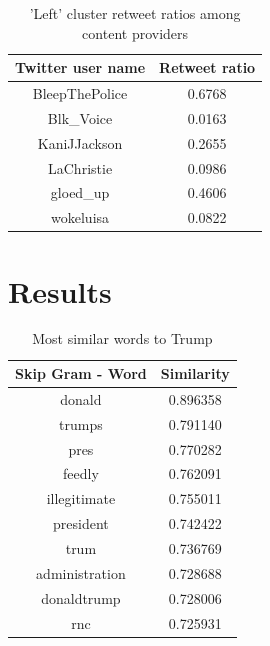 \documentclass[12pt, authoryear]{elsarticle}
\begin{document}
\begin{center}
\begin{table}[H]
\begin{tabular}{ c c } 
Twitter user name & Retweet ratio \\
 \hline
BleepThePolice &   0.6768 \\
Blk\_Voice       &  0.0163 \\
KaniJJackson   &   0.2655 \\
LaChristie  &      0.0986 \\
gloed\_up       &   0.4606 \\
wokeluisa     &    0.0822 \\
 \hline
\end{tabular}
\caption{'Left' cluster retweet ratios among content providers}
\label{table:2}
\end{table}
\end{center}

\section{Results}


\begin{center}
\begin{table}[H]
\begin{tabular}{ c c } 
Skip Gram - Word   &  Similarity \\
 \hline
donald   &  0.896358\\
trumps   &  0.791140\\
pres   &  0.770282\\
feedly   &  0.762091\\
illegitimate  &   0.755011\\
president   &  0.742422\\
trum   &  0.736769\\
administration  &   0.728688\\
donaldtrump   &  0.728006\\
rnc   &  0.725931\\
 \hline
\end{tabular}
\caption{Most similar words to Trump}
\label{table:5}
\end{table}
\end{center}
\end{document}
